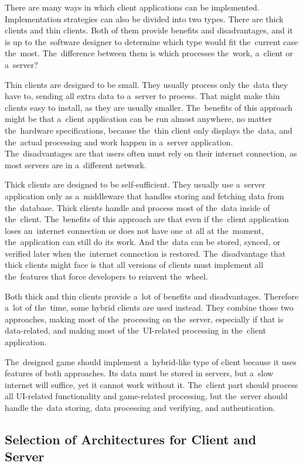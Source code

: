There are many ways in which client applications can be implemented.
Implementation strategies can also be divided into two types.
There are thick clients and thin clients.
Both of them provide benefits and disadvantages, and it is up to the~software designer to determine which type would fit the~current case the~most.
The~difference between them is which processes the~work, a~client or a~server?

Thin clients are designed to be small.
They usually process only the~data they have to, sending all extra data to a~server to process.
That might make thin clients easy to install, as they are usually smaller.
The~benefits of this approach might be that a~client application can be run almost anywhere, no matter the~hardware specifications, because the~thin client only displays the~data, and the~actual processing and work happen in a~server application.
The~disadvantages are that users often must rely on their internet connection, as most servers are in a~different network.

Thick clients are designed to be self-sufficient.
They usually use a~server application only as a~middleware that handles storing and fetching data from the~database.  
Thick clients handle and process most of the~data inside of the~client.
The~benefits of this approach are that even if the~client application loses an~internet connection or does not have one at all at the~moment, the~application can still do its work.
And the~data can be stored, synced, or verified later when the~internet connection is restored.
The~disadvantage that thick clients might face is that all versions of clients must implement all the~features that force developers to reinvent the~wheel.

Both thick and thin clients provide a~lot of benefits and disadvantages.
Therefore a~lot of the~time, some hybrid clients are used instead.
They combine those two approaches, making most of the~processing on the~server, especially if that is data-related, and making most of the~UI-related processing in the~client application.

The~designed game should implement a~hybrid-like type of client because it uses features of both approaches.
Its data must be stored in servers, but a~slow internet will suffice, yet it cannot work without it.
The~client part should process all UI-related functionality and game-related processing, but the~server should handle the~data storing, data processing and verifying, and authentication.

\subsection{Selection of Architectures for Client and Server}


